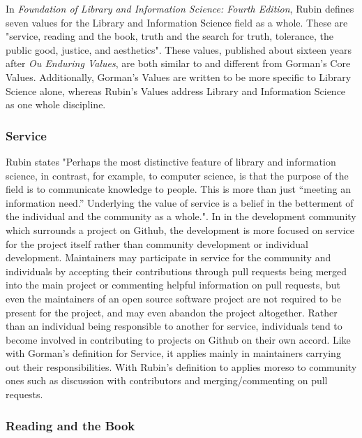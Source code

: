 In \textit{Foundation of Library and Information Science: Fourth Edition}, Rubin defines seven values for the Library and Information Science field as a whole. These are "service, reading and the book, truth and the search for truth, tolerance, the public good, justice, and aesthetics"\cite{rubin2016foundationslis}. These values, published about sixteen years after \textit{Ou Enduring Values}, are both similar to and different from Gorman's Core Values. Additionally, Gorman's Values are written to be more specific to Library Science alone, whereas Rubin's Values address Library and Information Science as one whole discipline. 

\subsubsection{Service}

Rubin states "Perhaps the most distinctive feature of library and information science, in contrast, for example, to computer science, is that the purpose of the field is to communicate knowledge to people. This is more than just “meeting an information need.” Underlying the value of service is a belief in the betterment of the individual and the community as a whole."\cite{rubin2016foundationslis}. In in the development community which surrounds a project on Github, the development is more focused on service for the project itself rather than community development or individual development. Maintainers may participate in service for the community and individuals by accepting their contributions through pull requests being merged into the main project or commenting helpful information on pull requests, but even the maintainers of an open source software project are not required to be present for the project, and may even abandon the project altogether. Rather than an individual being responsible to another for service, individuals tend to become involved in contributing to projects on Github on their own accord. Like with Gorman's definition for Service, it applies mainly in maintainers carrying out their responsibilities. With Rubin's definition to applies moreso to community ones such as discussion with contributors and merging/commenting on pull requests. 


\subsubsection{Reading and the Book}

